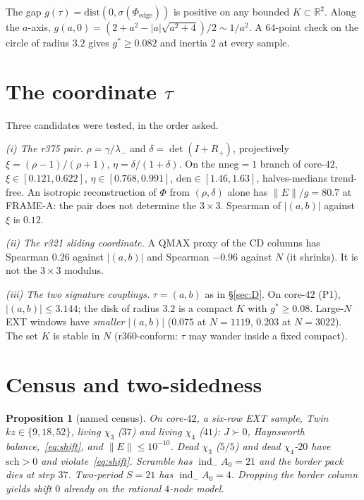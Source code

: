 \documentclass[11pt]{article}
\newtheorem{prop}{Proposition}
\theoremstyle{remark}
\newcommand{\R}{\mathbb{R}}
\newcommand{\indm}{\operatorname{ind}_{-}}
\begin{document}
The gap $g(\tau)=\mathrm{dist}(0,\sigma(\Phi_{\mathrm{edge}}))$
is positive on any bounded $K\subset\R^{2}$.
Along the $a$-axis,
$g(a,0)=(2+a^{2}-|a|\sqrt{a^{2}+4})/2\sim 1/a^{2}$.
A $64$-point check on the circle of radius $3.2$ gives
$g^{*}\ge 0.082$ and inertia $2$ at every sample.

\section{The coordinate $\tau$}\label{sec:tau}

Three candidates were tested, in the order asked.

\textit{\textup{(i)} The r375 pair.}
$\rho=\gamma/\lambda_{-}$ and $\delta=\det(I+R_{+})$,
projectively $\xi=(\rho-1)/(\rho+1)$, $\eta=\delta/(1+\delta)$.
On the $\mathrm{nneg}=1$ branch of core-$42$,
$\xi\in[0.121,0.622]$, $\eta\in[0.768,0.991]$,
$\mathrm{den}\in[1.46,1.63]$, halves-medians trend-free.
An isotropic reconstruction of $\Phi$ from $(\rho,\delta)$
alone has $\|E\|/g=80.7$ at FRAME-A: the pair does not
determine the $3\times 3$.
Spearman of $|(a,b)|$ against $\xi$ is $0.12$.

\textit{\textup{(ii)} The r321 sliding coordinate.}
A QMAX proxy of the CD columns has Spearman $0.26$ against
$|(a,b)|$ and Spearman $-0.96$ against $N$ (it shrinks).
It is not the $3\times 3$ modulus.

\textit{\textup{(iii)} The two signature couplings.}
$\tau=(a,b)$ as in \S\ref{sec:D}.
On core-$42$ (P1), $|(a,b)|\le 3.144$; the disk of radius $3.2$
is a compact $K$ with $g^{*}\ge 0.08$.
Large-$N$ EXT windows have \emph{smaller} $|(a,b)|$
($0.075$ at $N=1119$, $0.203$ at $N=3022$).
The set $K$ is stable in $N$ (r360-conform: $\tau$ may wander
inside a fixed compact).

\section{Census and two-sidedness}\label{sec:census}

\begin{prop}[named census]\label{prop:census}
On core-$42$, a six-row EXT sample, Twin $kz\in\{9,18,52\}$,
living $\chi_{3}$ ($37$) and living $\chi_{4}$ ($41$):
$J\succ 0$, Haynsworth balance,~\eqref{eq:shift}, and
$\|E\|\le 10^{-10}$.
Dead $\chi_{3}$ ($5/5$) and dead $\chi_{4}$-$20$ have
$\mathrm{sch}>0$ and violate~\eqref{eq:shift}.
Scramble has $\indm A_{0}=21$ and the border pack dies at step $37$.
Two-period $S=21$ has $\indm A_{0}=4$.
Dropping the border column yields shift $0$ already on the
rational $4$-node model.
\end{prop}
\end{document}
